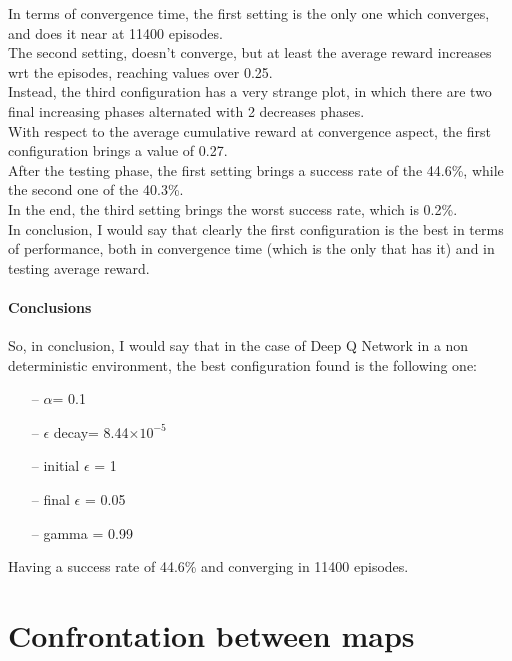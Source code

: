 \documentclass{article}
\begin{document}
In terms of convergence time, the first setting is the only one which converges, and does it near at 11400 episodes.
\\
The second setting, doesn't converge, but at least the average reward increases wrt the episodes, reaching values over 0.25.
\\
Instead, the third configuration has a very strange plot, in which there are two final increasing phases alternated with 2 decreases phases.
\\
With respect to the average cumulative reward at convergence aspect, the first configuration brings a value of 0.27.
\\
After the testing phase, the first setting brings a success rate of the 44.6\%, while the second one of the 40.3\%.
\\
In the end, the third setting brings the worst success rate, which is 0.2\%.
\\
In conclusion, I would say that clearly the first configuration is the best in terms of performance, both in convergence time (which is the only that has it) and in testing average reward.



\paragraph{Conclusions}

So, in conclusion, I would say that in the case of Deep Q Network in a non deterministic environment, the best configuration found is the following one:

\begin{itemize}
\item[--] $\alpha$= 0.1
\item[--] $\epsilon$ decay= 8.44$\times10^{-5}$
\item[--] initial $\epsilon$ = 1
\item[--] final $\epsilon$ = 0.05
\item[--] gamma = 0.99
\end{itemize}

Having a success rate of 44.6\% and converging in 11400 episodes.


\section{Confrontation between maps}
\end{document}
